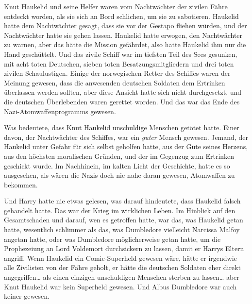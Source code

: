 Knut Haukelid und seine Helfer waren vom Nachtwächter der zivilen Fähre entdeckt worden, als sie sich an Bord schlichen, um sie zu sabotieren. Haukelid hatte dem Nachtwächter gesagt, dass sie vor der Gestapo fliehen würden, und der Nachtwächter hatte sie gehen lassen. Haukelid hatte erwogen, den Nachtwächter zu warnen, aber das hätte die Mission gefährdet, also hatte Haukelid ihm nur die Hand geschüttelt. Und das zivile Schiff war im tiefsten Teil des Sees gesunken, mit acht toten Deutschen, sieben toten Besatzungsmitgliedern und drei toten zivilen Schaulustigen. Einige der norwegischen Retter des Schiffes waren der Meinung gewesen, dass die anwesenden deutschen Soldaten dem Ertrinken überlassen werden sollten, aber diese Ansicht hatte sich nicht durchgesetzt, und die deutschen Überlebenden waren gerettet worden. Und das war das Ende des Nazi-Atomwaffenprogramms gewesen.

Was bedeutete, dass Knut Haukelid unschuldige Menschen getötet hatte. Einer davon, der Nachtwächter des Schiffes, war ein \emph{guter} Mensch gewesen. Jemand, der Haukelid unter Gefahr für sich selbst geholfen hatte, aus der Güte seines Herzens, aus den höchsten moralischen Gründen, und der im Gegenzug zum Ertrinken geschickt wurde.
Im Nachhinein, im kalten Licht der Geschichte, hatte es so ausgesehen, als wären die Nazis doch nie nahe daran gewesen, Atomwaffen zu bekommen.

Und Harry hatte nie etwas gelesen, was darauf hindeutete, dass Haukelid falsch gehandelt hatte.
Das war der Krieg im wirklichen Leben. Im Hinblick auf den Gesamtschaden und darauf, wen es getroffen hatte, war das, was Haukelid getan hatte, wesentlich schlimmer als das, was Dumbledore vielleicht Narcissa Malfoy angetan hatte, oder was Dumbledore möglicherweise getan hatte, um die Prophezeiung an Lord Voldemort durchsickern zu lassen, damit er Harrys Eltern angriff.
Wenn Haukelid ein Comic-Superheld gewesen wäre, hätte er irgendwie alle Zivilisten von der Fähre geholt, er hätte die deutschen Soldaten eher direkt angegriffen…
als einen einzigen unschuldigen Menschen sterben zu lassen…
aber Knut Haukelid war kein Superheld gewesen.
Und Albus Dumbledore war auch keiner gewesen.

